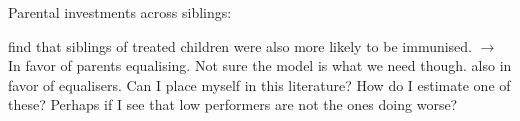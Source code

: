\documentclass[11pt,a4paper,twoside]{article}
\begin{document}






Parental investments across siblings:

\cite{adhvaryu_endowments_2016} find that siblings of treated children were also more likely to be immunised. $\rightarrow$ In favor of parents equalising. Not sure the model is what we need though. \cite{yi_early_2015} also in favor of equalisers. Can I place myself in this literature? How do I estimate one of these? Perhaps if I see that low performers are not the ones doing worse?
\end{document}
